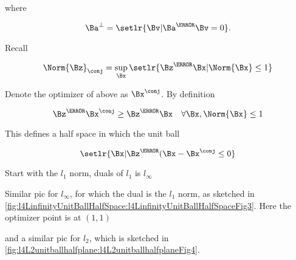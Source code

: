 where

\begin{equation}\label{eqn:convexOptimizationLecture4:40}
\Ba^\perp = \setlr{ \Bv | \Ba^\T \Bv = 0 }.
\end{equation}


Recall

\begin{equation}\label{eqn:convexOptimizationLecture4:60}
\Norm{\Bz}_\conj = \sup_\Bx \setlr{ \Bz^\T \Bx | \Norm{\Bx} \le 1 }
\end{equation}

Denote the optimizer of above as \( \Bx^\conj \).  By definition

\begin{equation}\label{eqn:convexOptimizationLecture4:80}
\Bz^\T \Bx^\conj \ge \Bz^\T \Bx \quad \forall \Bx, \Norm{\Bx} \le 1
\end{equation}

This defines a half space in which the unit ball

\begin{equation}\label{eqn:convexOptimizationLecture4:100}
\setlr{ \Bx | \Bz^\T (\Bx - \Bx^\conj \le 0 }
\end{equation}

Start with the \( l_1 \) norm, duals of \( l_1 \) is \( l_\infty \)


Similar pic for \( l_\infty \), for which the dual is the \( l_1 \) norm, as sketched in
\cref{fig:l4LinfinityUnitBallHalfSpace:l4LinfinityUnitBallHalfSpaceFig3}.
Here the optimizer point is at \( (1,1) \)


and a similar pic for \( l_2 \), which is sketched in \cref{fig:l4L2unitballhalfplane:l4L2unitballhalfplaneFig4}.


